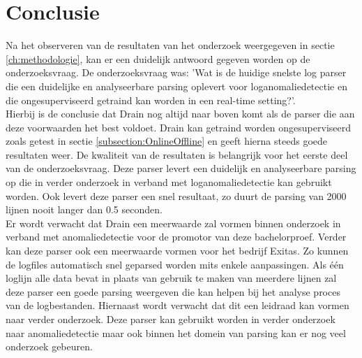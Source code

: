 
\chapter{Conclusie}
\label{ch:conclusie}


Na het observeren van de resultaten van het onderzoek weergegeven in sectie \ref{ch:methodologie}, kan er een duidelijk antwoord gegeven worden op de onderzoeksvraag. De onderzoeksvraag was: 'Wat is de huidige snelste log parser die een duidelijke en analyseerbare parsing oplevert voor loganomaliedetectie en die ongesuperviseerd getraind kan worden in een real-time setting?'.\\

Hierbij is de conclusie dat Drain nog altijd naar boven komt als de parser die aan deze voorwaarden het best voldoet. Drain kan getraind worden ongesuperviseerd zoals getest in sectie \ref{subsection:OnlineOffline} en geeft hierna steeds goede resultaten weer. De kwaliteit van de resultaten is belangrijk voor het eerste deel van de onderzoeksvraag. Deze parser levert een duidelijk en analyseerbare parsing op die in verder onderzoek in verband met loganomaliedetectie kan gebruikt worden. Ook levert deze parser een snel resultaat, zo duurt de parsing van 2000 lijnen nooit langer dan 0.5 seconden.\\

Er wordt verwacht dat Drain een meerwaarde zal vormen binnen onderzoek in verband met anomaliedetectie voor de promotor van deze bachelorproef. Verder kan deze parser ook een meerwaarde vormen voor het bedrijf Exitas. Zo kunnen de logfiles automatisch snel geparsed worden mits enkele aanpassingen. Als één loglijn alle data bevat in plaats van gebruik te maken van meerdere lijnen zal deze parser een goede parsing weergeven die kan helpen bij het analyse proces van de logbestanden. Hiernaast wordt verwacht dat dit een leidraad kan vormen naar verder onderzoek. Deze parser kan gebruikt worden in verder onderzoek naar anomaliedetectie maar ook binnen het domein van parsing kan er nog veel onderzoek gebeuren.\\

